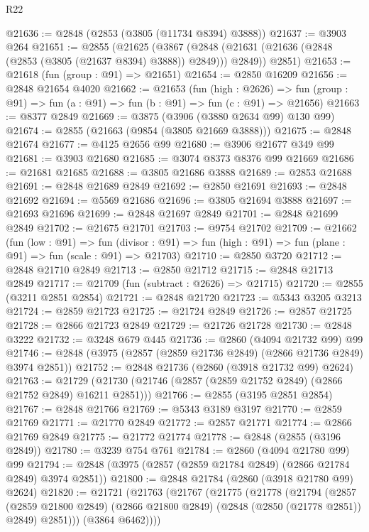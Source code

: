 \begin{lexlean}{R22}
\begin{coremodule}
@21636 := @2848 (@2853 (@3805 (@11734 @8394) @3888))
@21637 := @3903 @264
@21651 := @2855
    (@21625
      (@3867 (@2848 (@21631 (@21636 (@2848 (@2853 (@3805 (@21637 @8394) @3888)) @2849))) @2849))
      @2851)
@21653 := @21618 (fun (group : @91) => @21651)
@21654 := @2850 @16209
@21656 := @2848 @21654 @4020
@21662 := @21653
    (fun (high : @2626) =>
    fun (group : @91) => fun (a : @91) => fun (b : @91) => fun (c : @91) => @21656)
@21663 := @8377 @2849
@21669 := @3875 (@3906 (@3880 @2634 @99) @130 @99)
@21674 := @2855 (@21663 (@9854 (@3805 @21669 @3888)))
@21675 := @2848 @21674
@21677 := @4125 @2656 @99
@21680 := @3906 @21677 @349 @99
@21681 := @3903 @21680
@21685 := @3074 @8373 @8376 @99 @21669
@21686 := @21681 @21685
@21688 := @3805 @21686 @3888
@21689 := @2853 @21688
@21691 := @2848 @21689 @2849
@21692 := @2850 @21691
@21693 := @2848 @21692
@21694 := @5569 @21686
@21696 := @3805 @21694 @3888
@21697 := @21693 @21696
@21699 := @2848 @21697 @2849
@21701 := @2848 @21699 @2849
@21702 := @21675 @21701
@21703 := @9754 @21702
@21709 := @21662
    (fun (low : @91) =>
    fun (divisor : @91) => fun (high : @91) => fun (plane : @91) => fun (scale : @91) => @21703)
@21710 := @2850 @3720
@21712 := @2848 @21710 @2849
@21713 := @2850 @21712
@21715 := @2848 @21713 @2849
@21717 := @21709 (fun (subtract : @2626) => @21715)
@21720 := @2855 (@3211 @2851 @2854)
@21721 := @2848 @21720
@21723 := @5343 @3205 @3213
@21724 := @2859 @21723
@21725 := @21724 @2849
@21726 := @2857 @21725
@21728 := @2866 @21723 @2849
@21729 := @21726 @21728
@21730 := @2848 @3222
@21732 := @3248 @679 @445
@21736 := @2860 (@4094 @21732 @99) @99
@21746 := @2848 (@3975 (@2857 (@2859 @21736 @2849) (@2866 @21736 @2849) @3974 @2851))
@21752 := @2848 @21736 (@2860 (@3918 @21732 @99) @2624)
@21763 := @21729 (@21730 (@21746 (@2857 (@2859 @21752 @2849) (@2866 @21752 @2849) @16211 @2851)))
@21766 := @2855 (@3195 @2851 @2854)
@21767 := @2848 @21766
@21769 := @5343 @3189 @3197
@21770 := @2859 @21769
@21771 := @21770 @2849
@21772 := @2857 @21771
@21774 := @2866 @21769 @2849
@21775 := @21772 @21774
@21778 := @2848 (@2855 (@3196 @2849))
@21780 := @3239 @754 @761
@21784 := @2860 (@4094 @21780 @99) @99
@21794 := @2848 (@3975 (@2857 (@2859 @21784 @2849) (@2866 @21784 @2849) @3974 @2851))
@21800 := @2848 @21784 (@2860 (@3918 @21780 @99) @2624)
@21820 := @21721
    (@21763
      (@21767
        (@21775
          (@21778
            (@21794
              (@2857
                (@2859 @21800 @2849)
                (@2866 @21800 @2849)
                (@2848 (@2850 (@21778 @2851)) @2849)
                @2851)))
          (@3864 @6462))))

\end{coremodule}
\end{lexlean}

